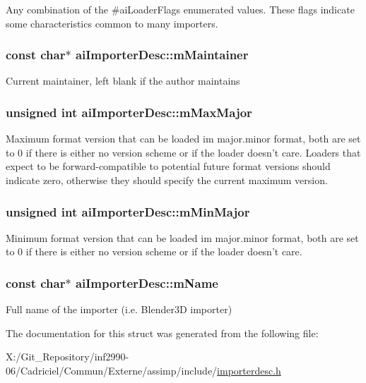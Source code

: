 Any combination of the \#ai\-Loader\-Flags enumerated values. These flags indicate some characteristics common to many importers. \hypertarget{structai_importer_desc_a53bf0ecb36ce0b97018b4b6bd2748f02}{
\subsubsection[{m\-Maintainer}]{\setlength{\rightskip}{0pt plus 5cm}const char$\ast$ ai\-Importer\-Desc\-::m\-Maintainer}}\label{structai_importer_desc_a53bf0ecb36ce0b97018b4b6bd2748f02}
Current maintainer, left blank if the author maintains \hypertarget{structai_importer_desc_a9d33eac3be20f7f4630f838a228ada63}{
\subsubsection[{m\-Max\-Major}]{\setlength{\rightskip}{0pt plus 5cm}unsigned int ai\-Importer\-Desc\-::m\-Max\-Major}}\label{structai_importer_desc_a9d33eac3be20f7f4630f838a228ada63}
Maximum format version that can be loaded im major.\-minor format, both are set to 0 if there is either no version scheme or if the loader doesn't care. Loaders that expect to be forward-\/compatible to potential future format versions should indicate zero, otherwise they should specify the current maximum version. \hypertarget{structai_importer_desc_aee34d348f522807f0a36607664e92a57}{
\subsubsection[{m\-Min\-Major}]{\setlength{\rightskip}{0pt plus 5cm}unsigned int ai\-Importer\-Desc\-::m\-Min\-Major}}\label{structai_importer_desc_aee34d348f522807f0a36607664e92a57}
Minimum format version that can be loaded im major.\-minor format, both are set to 0 if there is either no version scheme or if the loader doesn't care. \hypertarget{structai_importer_desc_a2a9d5fd818c01bba1a0a782722ab9495}{
\subsubsection[{m\-Name}]{\setlength{\rightskip}{0pt plus 5cm}const char$\ast$ ai\-Importer\-Desc\-::m\-Name}}\label{structai_importer_desc_a2a9d5fd818c01bba1a0a782722ab9495}
Full name of the importer (i.\-e. Blender3\-D importer) 

The documentation for this struct was generated from the following file\-:\begin{DoxyCompactItemize}
\item 
X\-:/\-Git\-\_\-\-Repository/inf2990-\/06/\-Cadriciel/\-Commun/\-Externe/assimp/include/\hyperlink{importerdesc_8h}{importerdesc.\-h}\end{DoxyCompactItemize}

